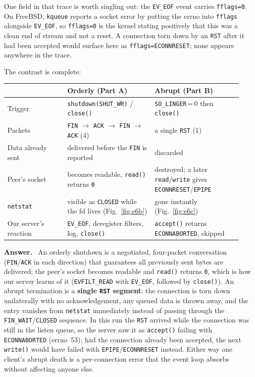 \documentclass[11pt,a4paper]{article}
\newenvironment{answer}
  {\begin{answerbox}\textbf{\color{accent}Answer.}\ }
  {\end{answerbox}}
\begin{document}
One field in that trace is worth singling out: the \texttt{EV\_EOF} event carries
\texttt{fflags=0}.  On FreeBSD, \texttt{kqueue} reports a socket error by putting the
errno into \texttt{fflags} alongside \texttt{EV\_EOF}, so \texttt{fflags=0} is the
kernel stating positively that this was a clean end of stream and not a reset.  A
connection torn down by an \texttt{RST} after it had been accepted would surface here as
\texttt{fflags=ECONNRESET}; none appears anywhere in the trace.

The contrast is complete:

\begin{center}
\small
\begin{tabular}{@{}p{0.24\linewidth}p{0.35\linewidth}p{0.35\linewidth}@{}}
\toprule
 & \textbf{Orderly (Part A)} & \textbf{Abrupt (Part B)} \\
\midrule
Trigger &
  \texttt{shutdown(SHUT\_WR)} / \texttt{close()} &
  \texttt{SO\_LINGER}\,=\,0 then \texttt{close()} \\
Packets &
  \texttt{FIN} $\rightarrow$ \texttt{ACK} $\rightarrow$ \texttt{FIN} $\rightarrow$ \texttt{ACK} (4) &
  a single \texttt{RST} (1) \\
Data already sent &
  delivered before the \texttt{FIN} is reported &
  discarded \\
Peer's socket &
  becomes readable, \texttt{read()} returns \texttt{0} &
  destroyed; a later \texttt{read}/\texttt{write} gives \texttt{ECONNRESET}/\texttt{EPIPE} \\
\texttt{netstat} &
  visible as \texttt{CLOSED} while the fd lives (Fig.~\ref{fig:e6b}) &
  gone instantly (Fig.~\ref{fig:e6c}) \\
Our server's reaction &
  \texttt{EV\_EOF}, deregister filters, log, \texttt{close()} &
  \texttt{accept()} returns \texttt{ECONNABORTED}, skipped \\
\bottomrule
\end{tabular}
\end{center}

\begin{answer}
An orderly shutdown is a negotiated, four-packet conversation
(\texttt{FIN}/\texttt{ACK} in each direction) that guarantees all previously sent bytes
are delivered; the peer's socket becomes readable and \texttt{read()} returns \texttt{0},
which is how our server learns of it (\texttt{EVFILT\_READ} with \texttt{EV\_EOF},
followed by \texttt{close()}).  An abrupt termination is a \textbf{single \texttt{RST}
segment}: the connection is torn down unilaterally with no acknowledgement, any queued
data is thrown away, and the entry vanishes from \texttt{netstat} immediately instead of
passing through the \texttt{FIN\_WAIT}/\texttt{CLOSED} sequence.  In this run the
\texttt{RST} arrived while the connection was still in the listen queue, so the server
saw it as \texttt{accept()} failing with \texttt{ECONNABORTED} (errno~53); had the
connection already been accepted, the next \texttt{write()} would have failed with
\texttt{EPIPE}/\texttt{ECONNRESET} instead.  Either way one client's abrupt death is a
per-connection error that the event loop absorbs without affecting anyone else.
\end{answer}
\end{document}
